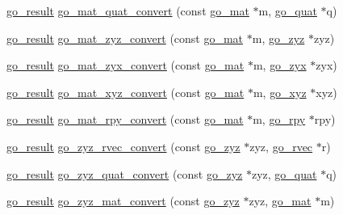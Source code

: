 \begin{DoxyCompactItemize}
\item 
\hyperlink{gotypes_8h_a55d48b38cd959f63c7e8db8337a9792a}{go\-\_\-result} \hyperlink{namespacegomotion_a56227bf3fda923a384a50d848d2c2314}{go\-\_\-mat\-\_\-quat\-\_\-convert} (const \hyperlink{structgomotion_1_1go__mat}{go\-\_\-mat} $\ast$m, \hyperlink{structgomotion_1_1go__quat}{go\-\_\-quat} $\ast$q)
\item 
\hyperlink{gotypes_8h_a55d48b38cd959f63c7e8db8337a9792a}{go\-\_\-result} \hyperlink{namespacegomotion_aad03f6a80af4b6d8f8c39e5af91484bc}{go\-\_\-mat\-\_\-zyz\-\_\-convert} (const \hyperlink{structgomotion_1_1go__mat}{go\-\_\-mat} $\ast$m, \hyperlink{structgomotion_1_1go__zyz}{go\-\_\-zyz} $\ast$zyz)
\item 
\hyperlink{gotypes_8h_a55d48b38cd959f63c7e8db8337a9792a}{go\-\_\-result} \hyperlink{namespacegomotion_ab6def00d51644dc86a0aad564b029ce3}{go\-\_\-mat\-\_\-zyx\-\_\-convert} (const \hyperlink{structgomotion_1_1go__mat}{go\-\_\-mat} $\ast$m, \hyperlink{structgomotion_1_1go__zyx}{go\-\_\-zyx} $\ast$zyx)
\item 
\hyperlink{gotypes_8h_a55d48b38cd959f63c7e8db8337a9792a}{go\-\_\-result} \hyperlink{namespacegomotion_ac8969285bc78a45cc21064577803c758}{go\-\_\-mat\-\_\-xyz\-\_\-convert} (const \hyperlink{structgomotion_1_1go__mat}{go\-\_\-mat} $\ast$m, \hyperlink{structgomotion_1_1go__xyz}{go\-\_\-xyz} $\ast$xyz)
\item 
\hyperlink{gotypes_8h_a55d48b38cd959f63c7e8db8337a9792a}{go\-\_\-result} \hyperlink{namespacegomotion_ae3d47ff3b11c3be6ec86196b5acca01f}{go\-\_\-mat\-\_\-rpy\-\_\-convert} (const \hyperlink{structgomotion_1_1go__mat}{go\-\_\-mat} $\ast$m, \hyperlink{structgomotion_1_1go__rpy}{go\-\_\-rpy} $\ast$rpy)
\item 
\hyperlink{gotypes_8h_a55d48b38cd959f63c7e8db8337a9792a}{go\-\_\-result} \hyperlink{namespacegomotion_ad53feb4160060f91e636345961c12c1d}{go\-\_\-zyz\-\_\-rvec\-\_\-convert} (const \hyperlink{structgomotion_1_1go__zyz}{go\-\_\-zyz} $\ast$zyz, \hyperlink{structgomotion_1_1go__rvec}{go\-\_\-rvec} $\ast$r)
\item 
\hyperlink{gotypes_8h_a55d48b38cd959f63c7e8db8337a9792a}{go\-\_\-result} \hyperlink{namespacegomotion_ad0211d9ce3c6f9e8fbbe80a184b15d9e}{go\-\_\-zyz\-\_\-quat\-\_\-convert} (const \hyperlink{structgomotion_1_1go__zyz}{go\-\_\-zyz} $\ast$zyz, \hyperlink{structgomotion_1_1go__quat}{go\-\_\-quat} $\ast$q)
\item 
\hyperlink{gotypes_8h_a55d48b38cd959f63c7e8db8337a9792a}{go\-\_\-result} \hyperlink{namespacegomotion_a4d8ad1df8907c07480486bc9284f3cfa}{go\-\_\-zyz\-\_\-mat\-\_\-convert} (const \hyperlink{structgomotion_1_1go__zyz}{go\-\_\-zyz} $\ast$zyz, \hyperlink{structgomotion_1_1go__mat}{go\-\_\-mat} $\ast$m)

\end{DoxyCompactItemize}
